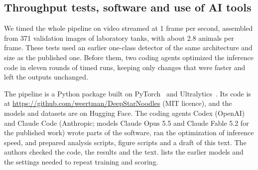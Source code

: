 \subsection*{Throughput tests, software and use of AI tools}

We timed the whole pipeline on video streamed at 1 frame per second, assembled from 371 validation images of laboratory tanks, with about 2.8 animals per frame.
These tests used an earlier one-class detector of the same architecture and size as the published one.
Before them, two coding agents optimized the inference code in eleven rounds of timed runs, keeping only changes that were faster and left the outputs unchanged.

The pipeline is a Python package built on PyTorch~\cite{paszke2019pytorch} and Ultralytics~\cite{jocher2026ultralytics}.
Its code is at \url{https://github.com/weertman/DeepStarNoodles} (MIT licence), and the models and datasets are on Hugging Face.
The coding agents Codex (OpenAI) and Claude Code (Anthropic; models Claude Opus 5.5 and Claude Fable 5.2 for the published work) wrote parts of the software, ran the optimization of inference speed, and prepared analysis scripts, figure scripts and a draft of this text.
The authors checked the code, the results and the text.
 lists the earlier models and the settings needed to repeat training and scoring.
